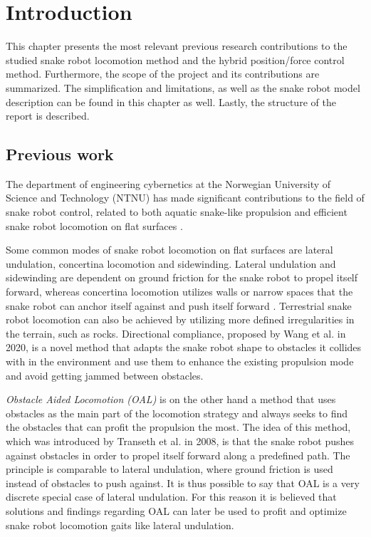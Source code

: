 
\chapter{Introduction}\label{Chapter:introduction}

This chapter presents the most relevant previous research contributions to the studied snake robot locomotion method and the hybrid position/force control method. Furthermore, the scope of the project and its contributions are summarized. The simplification and limitations, as well as the snake robot model description can be found in this chapter as well. Lastly, the structure of the report is described.

\section{Previous work}

The department of engineering cybernetics at the Norwegian University of Science and Technology (NTNU) has made significant contributions to the field of snake robot control, related to both aquatic snake-like propulsion and efficient snake robot locomotion on flat surfaces \cite{StavdahlNote}.

Some common modes of snake robot locomotion on flat surfaces are lateral undulation, concertina locomotion and sidewinding. Lateral undulation and sidewinding are dependent on ground friction for the snake robot to propel itself forward, whereas concertina locomotion utilizes walls or narrow spaces that the snake robot can anchor itself against and push itself forward \cite{liljeback2012snake}. Terrestrial snake robot locomotion can also be achieved by utilizing more defined irregularities in the terrain, such as rocks. Directional compliance, proposed by Wang et al. \cite{wang2020directional} in 2020, is a novel method that adapts the snake robot shape to obstacles it collides with in the environment and use them to enhance the existing propulsion mode and avoid getting jammed between obstacles.

\textit{Obstacle Aided Locomotion (OAL)} is on the other hand a method that uses obstacles as the main part of the locomotion strategy and always seeks to find the obstacles that can profit the propulsion the most. The idea of this method, which was introduced by Transeth et al. \cite{transeth2008snake} in 2008, is that the snake robot pushes against obstacles in order to propel itself forward along a predefined path. The principle is comparable to lateral undulation, where ground friction is used instead of obstacles to push against. It is thus possible to say that OAL is a very discrete special case of lateral undulation. For this reason it is believed that solutions and findings regarding OAL can later be used to profit and optimize snake robot locomotion gaits like lateral undulation.

